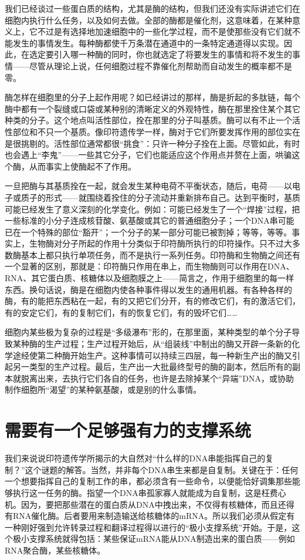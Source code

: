 我们已经谈过一些蛋白质的结构，尤其是酶的结构，但我们还没有实际讲述它们在细胞内执行什么任务，以及如何去做。全部的酶都是催化剂，这意味着，在某种意义上，它不过是有选择地加速细胞中的一些化学过程，而不是使那些没有它们就不能发生的事情发生。每种酶都使千万条潜在通道中的一条特定通道得以实现。因此，在选定要引入哪一种酶的同时，你也就选定了将要发生的事情和将不发生的事情——尽管从理论上说，任何细胞过程不靠催化剂帮助而自动发生的概率都不是零。

酶怎样在细胞里的分子上起作用呢？如已经讲过的那样，酶是折起的多肽链，每个酶中都有一个裂缝或口袋或某种别的清晰定义的外观特性，酶在那里拴住某个其它种类的分子。这个地点叫活性部位，拴在那里的分子叫基质。酶可以有不止一个活性部位和不只一个基质。像印符遗传学一样，酶对于它们所要发挥作用的部位实在是很挑剔的。活性部位通常都很“挑食”：只许一种分子拴在上面。尽管如此，有时也会遇上“李鬼”——一些其它分子，它们也能适应这个作用点并赘在上面，哄骗这个酶，从而事实上使酶起不了作用。

一旦把酶与其基质拴在一起，就会发生某种电荷不平衡状态，随后，电荷——以电子或质子的形式——就围绕着拴住的分子流动并重新排布自己。达到平衡时，基质可能已经发生了意义深刻的化学变化。例如：可能已经发生了一个“焊接”过程，把一些标准的小分子连成核苷酸、氨基酸或其它的普通细胞分子；一个DNA串可能已在一个特殊的部位“豁开”；一个分子的某一部分可能已被割掉；等等，等等。事实上，生物酶对分子所起的作用十分类似于印符酶所执行的印符操作。只不过大多数酶基本上都只执行单项任务，而不是执行一系列任务。印符酶和生物酶之间还有一个显著的区别，那就是：印符酶只作用在串上，而生物酶则可以作用在DNA、RNA、其它蛋白质、核糖体以及细胞膜之上——简言之，作用于细胞里的每一样东西。换句话说，酶是在细胞内使各种事件得以发生的通用机器。有各种各样的酶，有的能把东西粘在一起，有的又把它们分开，有的修改它们，有的激活它们，有的安定它们，有的复制它们，有的恢复它们，有的毁坏它们……

细胞内某些极为复杂的过程是“多级瀑布”形的，在那里面，某种类型的单个分子导致某种酶的生产过程；生产过程开始后，从“组装线”中制出的酶又开辟一条新的化学途经使第二种酶开始生产。这种事情可以持续三四层，每一种新生产出的酶又引起另一类型的生产过程。最后，生产出一大批最终型号的酶的副本，然后所有的副本就脱离出来，去执行它们各自的任务，也许是去除掉某个“异端”DNA，或协助制作细胞所“渴望”的某种氨基酸，或是别的什么事情。

\section{需要有一个足够强有力的支撑系统}

我们来说说印符遗传学所揭示的大自然对“什么样的DNA串能指挥自己的复制？”这个谜题的解答。当然，并非每个DNA串生来都是自复制。关键在于：任何一个想要指挥自己的复制工作的串，都必须含有一些命令，以便能恰好调集那些能够执行这一任务的酶。指望一个DNA串孤家寡人就能成为自复制，这是枉费心机。因为，要把那些潜在的蛋白质从DNA中拽出来，不仅得有核糖体，而且还得有RNA催化酶。后者要用来制造输送给核糖体的mRNA。所以我们必须从假定有一种刚好强到允许转录过程和翻译过程得以进行的“极小支撑系统”开始。于是，这个极小支撑系统就得包括：某些保证mRNA能从DNA制造出来的蛋白质——例如RNA聚合酶，某些核糖体。

